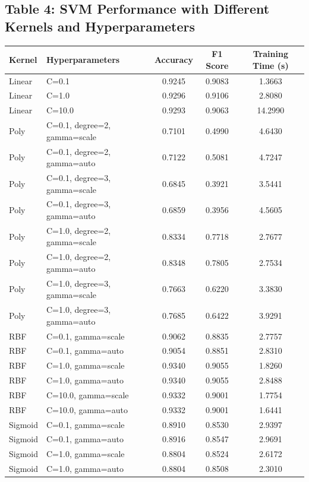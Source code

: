 \documentclass[12pt]{article}
\begin{document}
\subsection*{Table 4: SVM Performance with Different Kernels and Hyperparameters}
\begin{center}
\begin{tabular}{l l c c c}
\toprule
\textbf{Kernel} & \textbf{Hyperparameters} & \textbf{Accuracy} & \textbf{F1 Score} & \textbf{Training Time (s)} \\
\midrule
Linear & C=0.1 & 0.9245 & 0.9083 & 1.3663 \\
Linear & C=1.0 & 0.9296 & 0.9106 & 2.8080 \\
Linear & C=10.0 & 0.9293 & 0.9063 & 14.2990 \\
Poly & C=0.1, degree=2, gamma=scale & 0.7101 & 0.4990 & 4.6430 \\
Poly & C=0.1, degree=2, gamma=auto & 0.7122 & 0.5081 & 4.7247 \\
Poly & C=0.1, degree=3, gamma=scale & 0.6845 & 0.3921 & 3.5441 \\
Poly & C=0.1, degree=3, gamma=auto & 0.6859 & 0.3956 & 4.5605 \\
Poly & C=1.0, degree=2, gamma=scale & 0.8334 & 0.7718 & 2.7677 \\
Poly & C=1.0, degree=2, gamma=auto & 0.8348 & 0.7805 & 2.7534 \\
Poly & C=1.0, degree=3, gamma=scale & 0.7663 & 0.6220 & 3.3830 \\
Poly & C=1.0, degree=3, gamma=auto & 0.7685 & 0.6422 & 3.9291 \\
RBF & C=0.1, gamma=scale & 0.9062 & 0.8835 & 2.7757 \\
RBF & C=0.1, gamma=auto & 0.9054 & 0.8851 & 2.8310 \\
RBF & C=1.0, gamma=scale & 0.9340 & 0.9055 & 1.8260 \\
RBF & C=1.0, gamma=auto & 0.9340 & 0.9055 & 2.8488 \\
RBF & C=10.0, gamma=scale & 0.9332 & 0.9001 & 1.7754 \\
RBF & C=10.0, gamma=auto & 0.9332 & 0.9001 & 1.6441 \\
Sigmoid & C=0.1, gamma=scale & 0.8910 & 0.8530 & 2.9397 \\
Sigmoid & C=0.1, gamma=auto & 0.8916 & 0.8547 & 2.9691 \\
Sigmoid & C=1.0, gamma=scale & 0.8804 & 0.8524 & 2.6172 \\
Sigmoid & C=1.0, gamma=auto & 0.8804 & 0.8508 & 2.3010 \\
\bottomrule
\end{tabular}
\end{center}
\end{document}
